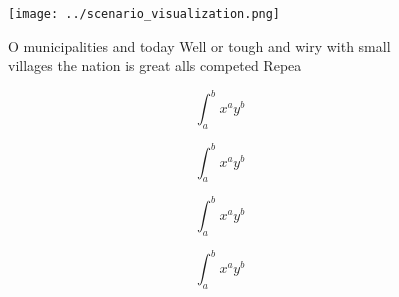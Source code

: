 \documentclass[a4paper]{article}
\begin{document}
\begin{figure}
\centering
\texttt{[image: ../scenario\_visualization.png]}
\caption{O municipalities and today Well or tough and wiry with small villages the nation is great alls competed Repea
}
\end{figure}
 
\[ \int_{a}^{b}{x^{a}y^{b}} \]

\[ \int_{a}^{b}{x^{a}y^{b}} \]

\[ \int_{a}^{b}{x^{a}y^{b}} \]

\[ \int_{a}^{b}{x^{a}y^{b}} \]
\end{document}
